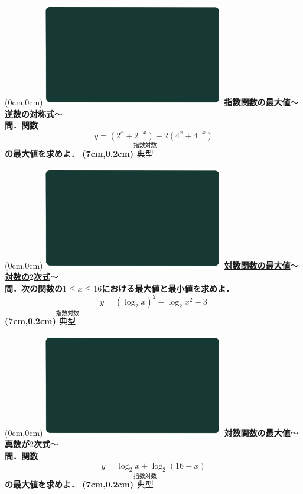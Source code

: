 \documentclass[10pt,
fleqn,
dvipdfmx,
uplatex
]{jsarticle}
\begin{document}
\at(0cm,0cm){\includegraphics[width=8cm,bb=0 0 1920 1080]{./media_local/smart_background/指数対数.jpeg}}
{\color{orange}\bf\boldmath\large\underline{指数関数の最大値$〜$逆数の対称式$〜$}}\vspace{0.3zw}\\
\LARGE 
\bf\boldmath 問．関数
\Large
\[ y=\left(2^x+2^{-x}\right)-2\left(4^x+4^{-x}\right)\]
\LARGE
の最大値を求めよ．
\at(7cm,0.2cm){\small\color{bradorange}$\overset{\text{指数対数}}{\text{典型}}$}


\newpage



\at(0cm,0cm){\includegraphics[width=8cm,bb=0 0 1920 1080]{./media_local/smart_background/指数対数.jpeg}}
{\color{orange}\bf\boldmath\large\underline{対数関数の最大値$〜$対数の$2$次式$〜$}}\vspace{0.3zw}\\
\Large 
\bf\boldmath 問．次の関数の$1\leqq x\leqq {16}$における最大値と最小値を求めよ．
\[y=\left(\log _2x\right)^2-\log _2x^2-3\]
\at(7cm,0.2cm){\small\color{bradorange}$\overset{\text{指数対数}}{\text{典型}}$}


\newpage



\at(0cm,0cm){\includegraphics[width=8cm,bb=0 0 1920 1080]{./media_local/smart_background/指数対数.jpeg}}
{\color{orange}\bf\boldmath\large\underline{対数関数の最大値$〜$真数が$2$次式$〜$}}\vspace{0.3zw}\\
\LARGE  
\bf\boldmath 問．関数
\Large
\[y=\log _2x+\log _2\left({16}-x\right)\]
\LARGE  
の最大値を求めよ．
\at(7cm,0.2cm){\small\color{bradorange}$\overset{\text{指数対数}}{\text{典型}}$}
\end{document}
